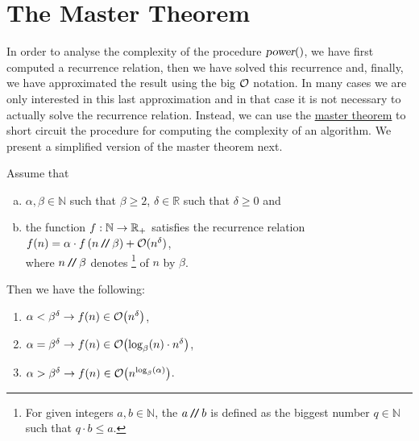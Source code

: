 \section{The Master Theorem}
In order to analyse the complexity of  the procedure $\textsl{power}()$,
we have first computed a  recurrence relation, then we have solved this recurrence and, finally,  
we have approximated the result using the big $\mathcal{O}$ notation.  In many cases we are only interested in this
last approximation and in that case it is not necessary to actually solve the recurrence relation.  
Instead, we can use the 
\href{http://en.wikipedia.org/wiki/Master_theorem#Generic_form}{master theorem} to short 
circuit the procedure for computing the complexity of an algorithm. 
We present a simplified version of the master theorem next.

\begin{Theorem} 
  Assume that 
  \begin{enumerate}[(a)]
  \item $\alpha,\beta \in \mathbb{N}$ such that  $\beta \geq 2$, $\delta \in \mathbb{R}$ such that $\delta \geq
    0$ and
  \item the function $f:{\mathbb N} \rightarrow {\mathbb R}_+$ satisfies the recurrence relation
        \\[0.2cm]
        \hspace*{1.3cm}
        $f(n) = \alpha \cdot f\left(n \mbox{\,\texttt{/}$\!$\texttt{/}\,} \beta\right) + \mathcal{O}(n^\delta)$,
        \\[0.2cm]
        where $n \mbox{\,\texttt{/}$\!$\texttt{/}\,} \beta$ denotes \footnote{
          For given integers $a, b \in \mathbb{N}$, the  $a \mbox{\,\texttt{/}$\!$\texttt{/}\,} b$
          is defined as the biggest number $q \in \mathbb{N}$ such that $q \cdot b \leq a$.  
        }  
        of $n$ by $\beta$.
  \end{enumerate}
  Then we have the following:
  \begin{enumerate}
  \item $\alpha < \beta^\delta\rightarrow f(n) \in \mathcal{O}\bigl(n^{\delta}\bigr)$,
  \item $\alpha = \beta^\delta\rightarrow f(n) \in \mathcal{O}\bigl(\log_\beta(n) \cdot n^{\delta}\bigr)$,
  \item $\alpha > \beta^{\delta} \rightarrow f(n) \in \mathcal{O}\bigl(n^{\log_{\beta}(\alpha)}\bigr)$. 
  \end{enumerate}
\end{Theorem}

